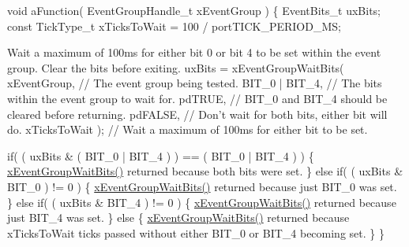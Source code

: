 \begin{DoxyPre}   void aFunction( EventGroupHandle\_t xEventGroup )
   \{
   EventBits\_t uxBits;
   const TickType\_t xTicksToWait = 100 / portTICK\_PERIOD\_MS;\end{DoxyPre}



\begin{DoxyPre}Wait a maximum of 100ms for either bit 0 or bit 4 to be set within
the event group.  Clear the bits before exiting.
        uxBits = xEventGroupWaitBits(
                    xEventGroup,    // The event group being tested.
                    BIT\_0 | BIT\_4,  // The bits within the event group to wait for.
                    pdTRUE,         // BIT\_0 and BIT\_4 should be cleared before returning.
                    pdFALSE,        // Don't wait for both bits, either bit will do.
                    xTicksToWait ); // Wait a maximum of 100ms for either bit to be set.\end{DoxyPre}



\begin{DoxyPre}        if( ( uxBits \& ( BIT\_0 | BIT\_4 ) ) == ( BIT\_0 | BIT\_4 ) )
        \{
\hyperlink{event__groups_8h_aab9d5b405bc57b7624dcabe9a9a503db}{xEventGroupWaitBits()} returned because both bits were set.
        \}
        else if( ( uxBits \& BIT\_0 ) != 0 )
        \{
\hyperlink{event__groups_8h_aab9d5b405bc57b7624dcabe9a9a503db}{xEventGroupWaitBits()} returned because just BIT\_0 was set.
        \}
        else if( ( uxBits \& BIT\_4 ) != 0 )
        \{
\hyperlink{event__groups_8h_aab9d5b405bc57b7624dcabe9a9a503db}{xEventGroupWaitBits()} returned because just BIT\_4 was set.
        \}
        else
        \{
\hyperlink{event__groups_8h_aab9d5b405bc57b7624dcabe9a9a503db}{xEventGroupWaitBits()} returned because xTicksToWait ticks passed
without either BIT\_0 or BIT\_4 becoming set.
        \}
   \}
   \end{DoxyPre}
 